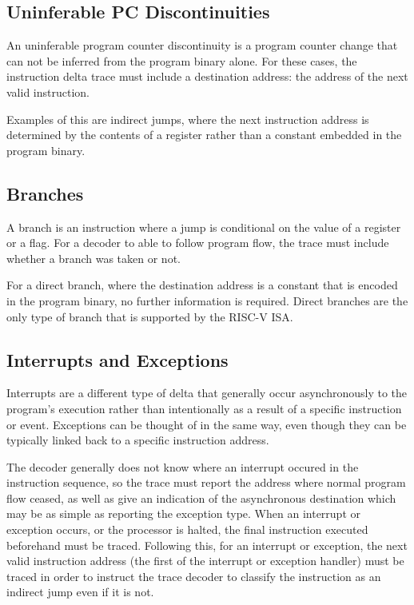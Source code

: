 \subsection{Uninferable PC Discontinuities} \label{uninfpc}

An uninferable program counter discontinuity is a program counter change
that can not be inferred from the program binary alone. For these cases,
the instruction delta trace must include a destination address: the
address of the next valid instruction.

Examples of this are indirect jumps, where
the next instruction address is determined by the contents of a
register rather than a constant embedded in the program binary.

\subsection{Branches} \label{branches}

A branch is an instruction where a jump is conditional on the
value of a register or a flag. For a decoder to able to follow program flow,
the trace must include whether a branch was taken or not.

For a direct branch, where the destination address is a constant that
is encoded in the program binary, no further information is required.
Direct branches are the only type of branch that is supported by the
RISC-V ISA.

\subsection{Interrupts and Exceptions} \label{interruptsexceptions}

Interrupts are a different type of delta that generally occur
asynchronously to the program's execution rather than intentionally as
a result of a specific instruction or event. Exceptions can be thought
of in the same way, even though they can be typically linked back to a
specific instruction address.

The decoder generally does not know
where an interrupt occured in the instruction sequence, so the trace
must report the address where normal program flow ceased, as well as
give an indication of the asynchronous destination which may be as
simple as reporting the exception type.  When an interrupt or
exception occurs, or the processor is halted, the final instruction
executed beforehand must be traced.  Following this, for an interrupt
or exception, the next valid instruction address (the first of the
interrupt or exception handler) must be traced in order to instruct the
trace decoder to classify the instruction as an indirect jump even
if it is not.

